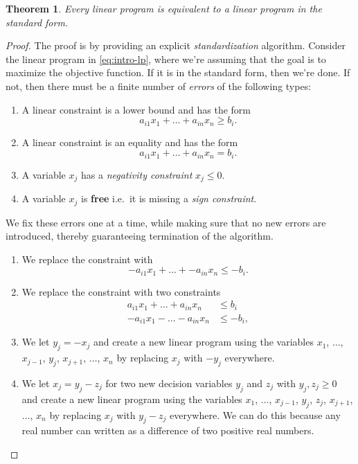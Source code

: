 \documentclass[
]{book}
\providecommand{\tightlist}{%
  \setlength{\itemsep}{0pt}\setlength{\parskip}{0pt}}
\newtheorem{theorem}{Theorem}[chapter]
\theoremstyle{definition}
\theoremstyle{definition}
\theoremstyle{definition}
\theoremstyle{definition}
\theoremstyle{remark}
\begin{document}
\begin{theorem}
\protect\hypertarget{thm:lp-to-standard-form}{}\label{thm:lp-to-standard-form}Every linear program is equivalent to a linear program in the standard form.
\end{theorem}

\begin{proof}

The proof is by providing an explicit \emph{standardization} algorithm. Consider the linear program in \eqref{eq:intro-lp}, where we're assuming that the goal is to maximize the objective function. If it is in the standard form, then we're done. If not, then there must be a finite number of \emph{errors} of the following types:

\begin{enumerate}
\def\labelenumi{\arabic{enumi}.}
\tightlist
\item
  A linear constraint is a lower bound and has the form \[a_{i1} x_1 + \dots + a_{in} x_n \geq b_i.\]
\item
  A linear constraint is an equality and has the form \[a_{i1} x_1 + \dots + a_{in} x_n = b_i.\]
\item
  A variable \(x_j\) has a \emph{negativity constraint} \(x_j \leq 0\).
\item
  A variable \(x_j\) is \textbf{free} i.e.~it is missing a \emph{sign constraint}.
\end{enumerate}

We fix these errors one at a time, while making sure that no new errors are introduced, thereby guaranteeing termination of the algorithm.

\begin{enumerate}
\def\labelenumi{\arabic{enumi}.}
\tightlist
\item
  We replace the constraint with \[ -a_{i1} x_1 + \dots + -a_{in} x_n \leq -b_i. \]
\item
  We replace the constraint with two constraints
  \begin{align*}
    a_{i1} x_1 + \dots + a_{in} x_n &\leq b_i \\
    -a_{i1} x_1 - \dots - a_{in} x_n &\leq -b_i,
    \end{align*}
\item
  We let \(y_j = -x_j\) and create a new linear program using the variables \(x_1\), \(\dots\), \(x_{j-1}\), \(y_j\), \(x_{j+1}\), \(\dots\), \(x_n\) by replacing \(x_j\) with \(-y_j\) everywhere.
\item
  We let \(x_j = y_j - z_j\) for two new decision variables \(y_j\) and \(z_j\) with \(y_j, z_j \geq 0\) and create a new linear program using the variables \(x_1\), \(\dots\), \(x_{j-1}\), \(y_j\), \(z_j\), \(x_{j+1}\), \(\dots\), \(x_n\) by replacing \(x_j\) with \(y_j - z_j\) everywhere. We can do this because any real number can written as a difference of two positive real numbers.
\end{enumerate}

\end{proof}
\end{document}
